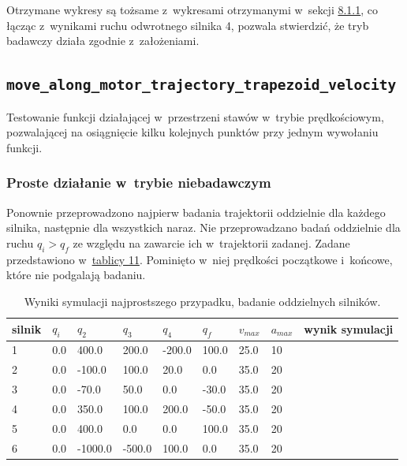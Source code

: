 \documentclass[a4paper, 12pt]{article}
\begin{document}
	Otrzymane wykresy są tożsame z~wykresami otrzymanymi w~sekcji \hyperref[sec:MPV]{8.1.1}, co łącząc z~wynikami ruchu odwrotnego silnika 4, pozwala stwierdzić, że tryb badawczy działa zgodnie z~założeniami. 

	\subsection{\texttt{move\_along\_motor\_trajectory\_trapezoid\_velocity}}
	Testowanie funkcji działającej w~przestrzeni stawów w~trybie prędkościowym, pozwalającej na osiągnięcie kilku kolejnych punktów przy jednym wywołaniu funkcji. 
	\subsubsection{Proste działanie w~trybie niebadawczym}
	\label{sec:MTV}
	Ponownie przeprowadzono najpierw badania trajektorii oddzielnie dla każdego silnika, następnie dla wszystkich naraz. Nie przeprowadzano badań oddzielnie dla ruchu $ q_i>q_f $ ze względu na zawarcie ich w~trajektorii zadanej. Zadane przedstawiono w~\hyperref[tab:setup5]{tablicy 11}. Pominięto w~niej prędkości początkowe i~końcowe, które nie podgalają badaniu.
	
	\begin{table}[H]
	\centering
	\begin{tabular}{|m{2.5em}|m{3em}|m{3.5em}|m{3em}|m{3em}|m{3em}|m{4em}|m{3em}|m{5em}|}
	\hline
	silnik&$ q_i $ & $ q_2 $ & $ q_3 $ & $q_4$ & $ q_f $ & $ v_{max} $ & $ a_{max} $&wynik symulacji\\
	\hline
	\hline
	\hspace{1em}1& 0.0 & 400.0 & 200.0 & -200.0 & 100.0 & 25.0 & 10&\hspace{2em}\checkmark\\ %
	\hline
	\hspace{1em}2& 0.0 & -100.0 & 100.0 & 20.0 & 0.0 & 35.0 & 20&\hspace{2em}\checkmark\\ %
	\hline
	\hspace{1em}3& 0.0 & -70.0 & 50.0 & 0.0 & -30.0 & 35.0 & 20&\hspace{2em}\checkmark\\ %
	\hline
	\hspace{1em}4& 0.0 & 350.0 & 100.0 & 200.0 & -50.0 & 35.0 & 20&\hspace{2em}\checkmark\\  %
	\hline
	\hspace{1em}5& 0.0 & 400.0 & 0.0 & 0.0 & 100.0 & 35.0 & 20&\hspace{2em}\checkmark\\  %
	\hline
	\hspace{1em}6& 0.0 & -1000.0 & -500.0 & 100.0 & 0.0 & 35.0 & 20&\hspace{2em}\checkmark\\  %
	\hline
	\end{tabular}
	\caption{Wyniki symulacji najprostszego przypadku, badanie oddzielnych silników.}
	\label{tab:setup5}
	\end{table}	
	
\end{document}
